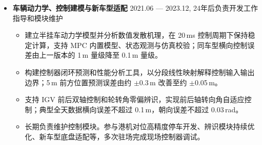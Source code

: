 \documentclass[zh]{resume}
\begin{document}
\begin{itemize}
  \item \textbf{车辆动力学、控制建模与新车型适配} \hfill 2021.06 --- 2023.12, 24年后负责开发工作指导和模块维护
  \begin{itemize}
    \item 建立半挂车动力学模型并分析数值发散机理，在 20\,ms 控制周期下保持稳定计算，支持 MPC 内置模型、状态观测与仿真校验；同车型横向控制误差由上一版本的 1\,m 量级降至 0.1\,m 量级。
    \item 构建控制器闭环预测和性能分析工具，以分段线性映射解释控制输入输出边界；5\,m 前方位置预测误差由约 $\pm$0.3\,m 改善至约 $\pm$0.05\,m。
    \item 支持 IGV 前后双轴控制和轮转角零偏辨识，实现前后轴转向角自适应控制；典型全天数据横向误差不超过 0.1\,m，朝向误差不超过 0.03\,rad。
    \item 长期负责维护控制模块。参与港机对位高精度停车开发、辨识模块持续优化、新车型底盘适配等，多次驻场完成现场控制器调试。
  \end{itemize}
\end{itemize}

\end{document}
